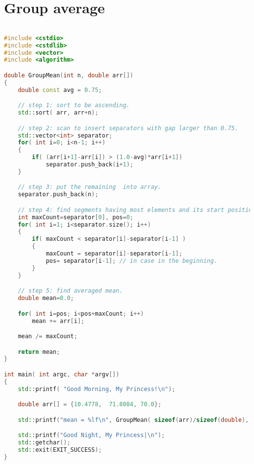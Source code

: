\section{Group average}
\begin{lstlisting}[language=C++]

#include <cstdio>
#include <cstdlib>
#include <vector>
#include <algorithm>

double GroupMean(int n, double arr[])
{
	double const avg = 0.75;

	// step 1: sort to be ascending.
	std::sort( arr, arr+n);

	// step 2: scan to insert separators with gap larger than 0.75.
	std::vector<int> separator;
	for( int i=0; i<n-1; i++)
	{
		if( (arr[i+1]-arr[i]) > (1.0-avg)*arr[i+1])
			separator.push_back(i+1);
	}

	// step 3: put the remaining  into array.
	separator.push_back(n);

	// step 4: find segments having most elements and its start position.
	int maxCount=separator[0], pos=0;
	for( int i=1; i<separator.size(); i++)
	{
		if( maxCount < separator[i]-separator[i-1] )
		{
			maxCount = separator[i]-separator[i-1];
			pos= separator[i-1]; // in case in the beginning.
		}
	}

	// step 5: find averaged mean.
	double mean=0.0;

	for( int i=pos; i<pos+maxCount; i++)
		mean += arr[i];

	mean /= maxCount;

	return mean;
}

int main( int argc, char *argv[])
{
	std::printf( "Good Morning, My Princess!\n");

	double arr[] = {10.4778,  71.8084, 70.0};

	std::printf("mean = %lf\n", GroupMean( sizeof(arr)/sizeof(double), arr) );

	std::printf("Good Night, My Princess|\n");
	std::getchar();
	std::exit(EXIT_SUCCESS);
}
\end{lstlisting}